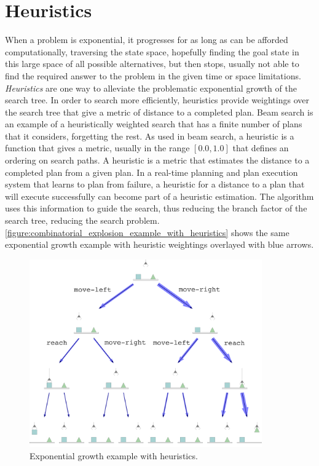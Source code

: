 \section{Heuristics}

When a problem is exponential, it progresses for as long as can be
afforded computationally, traversing the state space, hopefully
finding the goal state in this large space of all possible
alternatives, but then stops, usually not able to find the required
answer to the problem in the given time or space limitations.
\emph{Heuristics} are one way to alleviate the problematic exponential
growth of the search tree.  In order to search more efficiently,
heuristics provide weightings over the search tree that give a metric
of distance to a completed plan.  Beam search is an example of a
heuristically weighted search that has a finite number of plans that
it considers, forgetting the rest.  As used in beam search, a
heuristic is a function that gives a metric, usually in the range
$[0.0, 1.0]$ that defines an ordering on search paths.  A heuristic is
a metric that estimates the distance to a completed plan from a given
plan.  In a real-time planning and plan execution system that learns
to plan from failure, a heuristic for a distance to a plan that will
execute successfully can become part of a heuristic estimation.  The
algorithm uses this information to guide the search, thus reducing the
branch factor of the search tree, reducing the search problem.
{\mbox{\autoref{figure:combinatorial_explosion_example_with_heuristics}}}
shows the same exponential growth example with heuristic weightings
overlayed with blue arrows.
\begin{figure}
\center
\includegraphics[width=10cm]{gfx/combinatorial_explosion_example_with_heuristics}
\caption{Exponential growth example with heuristics.}
\label{figure:combinatorial_explosion_example_with_heuristics}
\end{figure}

